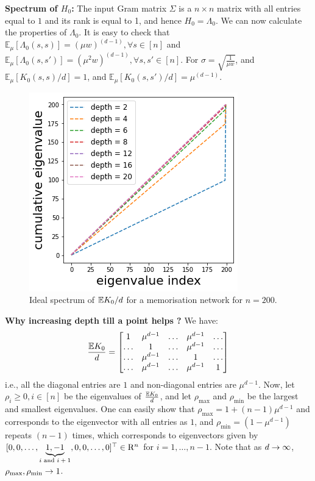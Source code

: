 \begin{appendix}
\textbf{Spectrum of $H_0$:} The input Gram matrix $\Sigma$ is a $n\times n$ matrix with all entries equal to $1$ and its rank is equal to 1, and hence $H_0=\Lambda_0$. We can now calculate the properties of $\Lambda_0$. It is easy to check that $\mathbb{E}_{\mu}\left[\Lambda_0(s,s)\right]=(\mu w)^{(d-1)},\forall s\in[n]$ and $\mathbb{E}_{\mu}\left[\Lambda_0(s,s')\right]=(\mu^2 w)^{(d-1)},\forall s,s'\in[n]$.  For $\sigma=\sqrt{\frac{1}{\mu w}}$, and $\mathbb{E}_{\mu}\left[K_0(s,s)/d\right]=1$, and $\mathbb{E}_{\mu}\left[K_0(s,s')/d\right]=\mu^{(d-1)}$. 
\begin{figure}
\centering
\includegraphics[scale=0.3]{figs/dgn-fra-ecdf-ideal-small.png}
\caption{Ideal spectrum of $\mathbb{E}{K_0}/d$ for a memorisation network for $n=200$.}
\label{fig:ideal-spectrum}
\end{figure}


\textbf{Why increasing depth till a point helps ?} 
We have:
\begin{align}\label{eq:mat}
\frac{\mathbb{E}{K_0}}{d}=\left[\begin{matrix}
1 &\mu^{d-1} &\ldots &\mu^{d-1} &\ldots\\ 
\ldots &1 &\ldots &\mu^{d-1} &\ldots\\ 
\ldots &\mu^{d-1} &\ldots &1 &\ldots \\
\ldots &\mu^{d-1} &\ldots &\mu^{d-1} &1\\ 
\end{matrix}\right]
\end{align}
i.e., all the diagonal entries are $1$ and non-diagonal entries are $\mu^{d-1}$. Now, let $\rho_i\geq 0,i \in [n]$ be the eigenvalues of $\frac{\mathbb{E}{K_0}}{d}$, and let $\rho_{\max}$ and $\rho_{\min}$ be the largest and smallest eigenvalues.  One can easily show that $\rho_{\max}=1+(n-1)\mu^{d-1}$ and corresponds to the eigenvector with all entries as $1$, and $\rho_{\min}=(1-\mu^{d-1})$ repeats $(n-1)$ times,  which corresponds to eigenvectors given by $[0, 0, \ldots, \underbrace{1, -1}_{\text{$i$ and $i+1$}}, 0,0,\ldots, 0]^\top \in \mathrm{R}^n$ for $i=1,\ldots,n-1$. Note that as $d\rightarrow\infty$, $\rho_{\max},\rho_{\min}\rightarrow 1$.


\end{appendix}
